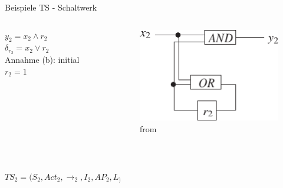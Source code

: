 \documentclass{beamer}
\begin{document}
\begin{frame}{Beispiele TS - Schaltwerk}
    \begin{Beispiel}
        \vspace*{-1em}
        \begin{columns}
                $y_2 = x_2 \land r_2$ \\
                $\delta_{r_2} = x_2 \lor r_2$\\[\baselineskip]

                Annahme (b): initial $r_2 = 1$

            \begin{figure}[H]
                    \centering
                    \includegraphics{exercise-2-1-2.pdf}
                    \caption*{\tiny from \cite[Exercise~2.1, p.~82]{model:checking}}
                \end{figure}
        \end{columns}~\\

        \pause

        \vspace*{-2em}
        $TS_2 = (S_2, Act_2, \rightarrow_2, I_2, AP_2, L_)$\vspace*{-1.5em}
        \begin{center}
        \end{center}
    \end{Beispiel}
\end{frame}
\end{document}
